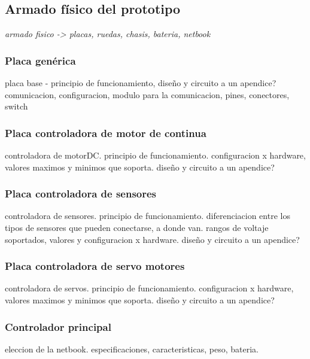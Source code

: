 \subsection{Armado f\'isico del prototipo}
\label{Harmado}

\emph{armado fisico -> placas, ruedas, chasis, bateria, netbook}

\subsubsection{Placa gen\'erica}
\label{HAPgenerica}

placa base - principio de funcionamiento, diseño y circuito a un apendice?
comunicacion, configuracion, modulo para la comunicacion, pines, conectores, switch

\subsubsection{Placa controladora de motor de continua}
\label{HAPmotorDC}

controladora de motorDC.
principio de funcionamiento.
configuracion x hardware, valores maximos y minimos que soporta.
diseño y circuito a un apendice?

\subsubsection{Placa controladora de sensores}
\label{HAPsensores}

controladora de sensores.
principio de funcionamiento.
diferenciacion entre los tipos de sensores que pueden conectarse, a donde van.
rangos de voltaje soportados, valores y configuracion x hardware.
diseño y circuito a un apendice?

\subsubsection{Placa controladora de servo motores}
\label{HAPservos}

controladora de servos.
principio de funcionamiento.
configuracion x hardware, valores maximos y minimos que soporta.
diseño y circuito a un apendice?

\subsubsection{Controlador principal}
\label{HAPprincipal}

eleccion de la netbook.
especificaciones, caracteristicas, peso, bateria.


